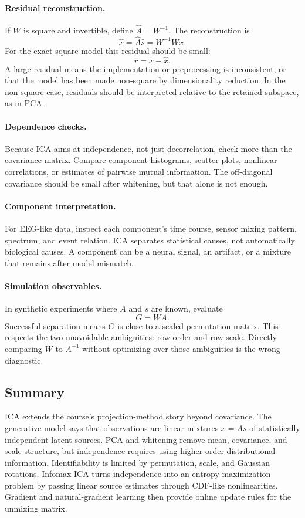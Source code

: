 \paragraph{Residual reconstruction.}
If \(W\) is square and invertible, define \(\hat{A}=W^{-1}\). The reconstruction is
\[
  \hat{x}=\hat{A}\hat{s}=W^{-1}Wx.
\]
For the exact square model this residual should be small:
\[
  r=x-\hat{x}.
\]
A large residual means the implementation or preprocessing is inconsistent, or that the model has been made non-square by dimensionality reduction. In the non-square case, residuals should be interpreted relative to the retained subspace, as in PCA.

\paragraph{Dependence checks.}
Because ICA aims at independence, not just decorrelation, check more than the covariance matrix. Compare component histograms, scatter plots, nonlinear correlations, or estimates of pairwise mutual information. The off-diagonal covariance should be small after whitening, but that alone is not enough.

\paragraph{Component interpretation.}
For EEG-like data, inspect each component's time course, sensor mixing pattern, spectrum, and event relation. ICA separates statistical causes, not automatically biological causes. A component can be a neural signal, an artifact, or a mixture that remains after model mismatch.

\paragraph{Simulation observables.}
In synthetic experiments where \(A\) and \(s\) are known, evaluate
\[
  G = W A.
\]
Successful separation means \(G\) is close to a scaled permutation matrix. This respects the two unavoidable ambiguities: row order and row scale. Directly comparing \(W\) to \(A^{-1}\) without optimizing over those ambiguities is the wrong diagnostic.

\subsection{Summary}

ICA extends the course's projection-method story beyond covariance. The generative model says that observations are linear mixtures \(x=As\) of statistically independent latent sources. PCA and whitening remove mean, covariance, and scale structure, but independence requires using higher-order distributional information. Identifiability is limited by permutation, scale, and Gaussian rotations. Infomax ICA turns independence into an entropy-maximization problem by passing linear source estimates through CDF-like nonlinearities. Gradient and natural-gradient learning then provide online update rules for the unmixing matrix.

